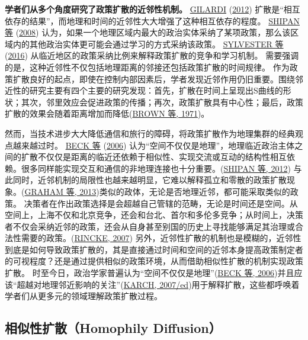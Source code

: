 \documentclass[
  12pt,
]{ctexart}
\begin{document}
\textbf{学者们从多个角度研究了政策扩散的近邻性机制。}
\protect\hyperlink{ref-Gilardi2012}{GILARDI} (\protect\hyperlink{ref-Gilardi2012}{2012}) 扩散是``相互依存的结果''，而地理和时间的近邻性大大增强了这种相互依存的程度。
\protect\hyperlink{ref-ShipanVolden2008}{SHIPAN 等} (\protect\hyperlink{ref-ShipanVolden2008}{2008}) 认为，如果一个地理区域内最大的政治实体采纳了某项政策，那么该区域内的其他政治实体更可能会通过学习的方式采纳该政策。
\protect\hyperlink{ref-SylvesterHaider-Markel2016}{SYLVESTER 等} (\protect\hyperlink{ref-SylvesterHaider-Markel2016}{2016}) 从临近地区的政策采纳比例来解释政策扩散的竞争和学习机制。
需要强调的是，这种近邻性不仅包括地理距离的邻接还包括政策扩散的时间规律。
作为政策扩散良好的起点，即使在控制内部因素后，学者发现近邻作用仍旧重要。围绕邻近性的研究主要有四个主要的研究发现：首先，扩散在时间上呈现出S曲线的形状；其次，邻里效应会促进政策的传播；再次，政策扩散具有中心性；最后，政策扩散的效果会随着距离增加而降低(\protect\hyperlink{ref-BrownCox1971}{BROWN 等, 1971})。

然而，当技术进步大大降低通信和旅行的障碍，将政策扩散作为地理集群的经典观点越来越过时。
\protect\hyperlink{ref-BeckEtAl2006}{BECK 等} (\protect\hyperlink{ref-BeckEtAl2006}{2006}) 认为``空间不仅仅是地理''，地理临近政治主体之间的扩散不仅仅是距离的临近还依赖于相似性、实现交流或互动的结构性相互依赖。很多同样能实现交互和通信的非地理连接也十分重要。(\protect\hyperlink{ref-ShipanVolden2012}{SHIPAN 等, 2012})
与此同时，近邻机制的局限性也越来越明显，它难以解释孤立和零散的政策扩散现象。(\protect\hyperlink{ref-GrahamEtAl2013}{GRAHAM 等, 2013})类似的政体，无论是否地理近邻，都可能采取类似的政策。
决策者在作出政策选择是会超越自己管辖的范畴，无论是时间还是空间。从空间上，上海不仅和北京竞争，还会和台北、首尔和多伦多竞争；从时间上，决策者不仅会采纳近邻的政策，还会从自身甚至别国的历史上寻找能够满足其治理或合法性需要的政策。(\protect\hyperlink{ref-Rincke2007}{RINCKE, 2007})
另外，近邻性扩散的机制也是模糊的，近邻性到底是如何导致政策扩散的，其是直接通过时间和空间的近邻本身提高政策制定者的可视程度？还是通过提供相似的政策环境，从而借助相似性扩散的机制实现政策扩散。
时至今日，政治学家普遍认为``空间不仅仅是地理''(\protect\hyperlink{ref-BeckEtAl2006}{BECK 等, 2006})并且应该``超越对地理邻近影响的关注''(\protect\hyperlink{ref-Karch2007a}{KARCH, 2007/ed})用于解释扩散，这些都呼唤着学者们从更多元的领域理解政策扩散过程。

\hypertarget{ux76f8ux4f3cux6027ux6269ux6563homophily-diffusion}{%
\subsection{相似性扩散（Homophily Diffusion）}\label{ux76f8ux4f3cux6027ux6269ux6563homophily-diffusion}}
\end{document}
